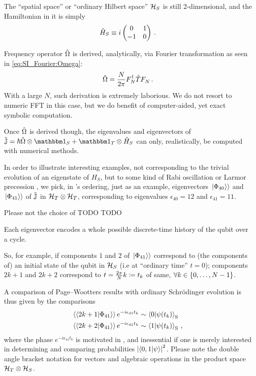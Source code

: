 The ``spatial space'' or ``ordinary Hilbert space'' $\mathcal{H}_S$
is still 2-dimensional, and the Hamiltonian in it is simply
\[
  \hat{H}_S \underset{}{\equiv}
  i
  \begin{pmatrix}
    0   & 1   \\
    -1  & 0
  \end{pmatrix}
  \, \text{.}
\]

Frequency operator $\hat{\Omega}$ is derived, analytically, via Fourier
transformation as seen in \eqref{eq:SI_Fourier:Omega}:
\[
  \hat{\Omega} = \frac{N}{2\pi} F^{\dagger}_{N} \hat{T} F^{}_{N} \, \text{.}
\]
With a large $N$,
such derivation is extremely laborious. We do not resort to
numeric FFT in this case, but we do benefit of computer-aided, yet exact
symbolic computation.

Once $\hat{\Omega}$ is derived though,
the eigenvalues and eigenvectors of
$\op{\mathbb{J}} = \hbar\op{\Omega}\ox\idop_S + \idop_T\ox\op{H}_S$
can only, realistically, be computed with numerical methods.

In order to illustrate interesting examples, not corresponding to the
trivial evolution of an eigenstate of $H_S$,
but to some kind of Rabi oscillation or Larmor precession
\parencite[\ch IV]{Cohen-Tannoudji}, we pick, in 's ordering,
just as an example,
eigenvectors $\left.\left| \Phi_{40} \right\rangle\right\rangle$ and $\left.\left| \Phi_{41} \right\rangle\right\rangle$ of $\hat{\mathbb{J}}$
in $\mathcal{H}_T \otimes \mathcal{H}_T$, corresponding to eigenvalues
$\epsilon_{40} = 12$ and $\epsilon_{41} = 11$.

Please not the choice of TODO TODO

Each eigenvector encodes a whole possible discrete-time history
of the qubit over a cycle.

So, for example, if components $1$ and $2$ of $\left.\left| \Phi_{41} \right\rangle\right\rangle$ correspond to
(the components of)
an initial state of the qubit in $\mathcal{H}_S$
(i.e at ``ordinary time'' $t=0$); components
$2k + 1$ and $2k + 2$ correspond to $t = \frac{2\pi}{N}k \coloneqq t_k$
of same, $\forall k \in \qty{0, \dots, N-1}$.

A comparison of Page--Wootters results with ordinary
Schr{\"o}dinger evolution is thus given by the comparisons
\begin{align}
  \left\langle\left\langle 2k+1 \middle| \Phi_{41} \right\rangle\right\rangle e^{-i \epsilon_{41} t_k} &\sim \braket{0}{\psi(t_k)}_{\mathrm{S}} \label{eq:comparison0} \\
  \left\langle\left\langle 2k+2 \middle| \Phi_{41} \right\rangle\right\rangle e^{-i \epsilon_{41} t_k} &\sim \braket{1}{\psi(t_k)}_{\mathrm{S}} \label{eq:comparison1}
  \,\text{,}
\end{align}
where the phase $e^{-i \epsilon_{41} t_k}$ is motivated in \cite[\it ``The Zero-eigenvalue'']{Lloyd:Time},
and inessential if one is merely interested in determining and comparing probabilities
$\qty|\braket{0,1}{\psi}|^2$. Please note the double angle bracket notation for vectors
and algebraic operations in the product space $\mathcal{H}_T \otimes \mathcal{H}_S$.

